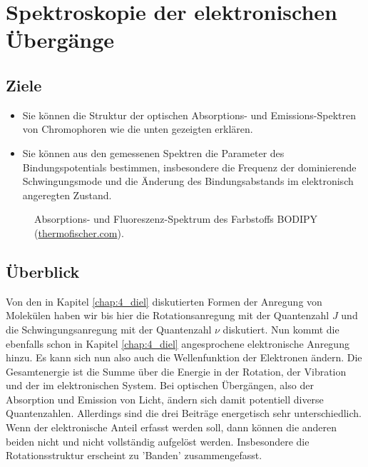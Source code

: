 \renewcommand{\chapterauthors}{Markus Lippitz}
\renewcommand{\lastmod}{13. Dezember 2021}


\chapter{Spektroskopie der elektronischen Übergänge}


\section{Ziele}

\begin{itemize}
\item Sie können die Struktur der optischen Absorptions- und Emissions-Spektren von Chromophoren wie die unten gezeigten erklären.

\item Sie können aus den gemessenen Spektren die Parameter des Bindungspotentials bestimmen, insbesondere die Frequenz der dominierende Schwingungsmode und die Änderung des Bindungsabstands im elektronisch angeregten Zustand.

\end{itemize}


\begin{figure}
  \caption{Absorptions- und Fluoreszenz-Spektrum des Farbstoffs BODIPY  (\href{https://www.thermofisher.com/de/de/home/life-science/cell-analysis/labeling-chemistry/fluorescence-spectraviewer.html?SID=srch-svtool&UID=10001moh}{thermofischer.com}).}
\end{figure}



\section{Überblick}

Von den in Kapitel \ref{chap:4_diel} diskutierten Formen der Anregung von Molekülen haben wir bis hier die Rotationsanregung mit der Quantenzahl $J$ und die Schwingungsanregung mit der Quantenzahl $\nu$ diskutiert. Nun kommt die ebenfalls schon in Kapitel  \ref{chap:4_diel} angesprochene elektronische Anregung hinzu. Es kann sich nun also auch die Wellenfunktion der Elektronen ändern. Die Gesamtenergie ist die Summe über die Energie in der Rotation, der Vibration und der im elektronischen System. Bei optischen Übergängen, also der Absorption und Emission von Licht, ändern sich damit potentiell diverse Quantenzahlen. Allerdings sind die drei Beiträge energetisch sehr unterschiedlich. Wenn der elektronische Anteil erfasst werden soll, dann können die anderen beiden nicht und nicht vollständig aufgelöst werden. Insbesondere die Rotationsstruktur erscheint zu 'Banden' zusammengefasst.



